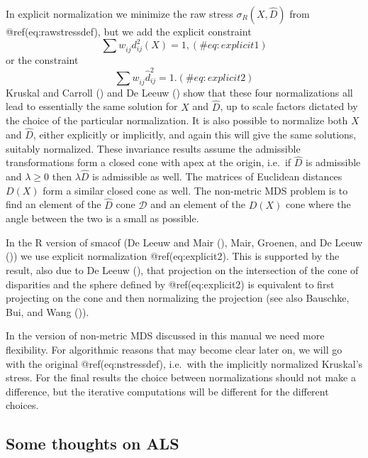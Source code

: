 \documentclass[
  12pt,
  letterpaper,
  DIV=11,
  numbers=noendperiod]{scrartcl}
\theoremstyle{plain}
\theoremstyle{remark}
\begin{document}
In explicit normalization we minimize the raw stress
\(\sigma_R(X,\hat D)\) from @ref(eq:rawstressdef), but we add the
explicit constraint \begin{equation}
\sum   w_{ij}^{\ }d_{ij}^2(X)=1,
(\#eq:explicit1)
\end{equation} or the constraint \begin{equation}
\sum   w_{ij}^{\ }\hat d_{ij}^2=1.
(\#eq:explicit2)
\end{equation} Kruskal and Carroll
() and De Leeuw
() show that these four normalizations
all lead to essentially the same solution for \(X\) and \(\hat D\), up
to scale factors dictated by the choice of the particular normalization.
It is also possible to normalize both \(X\) and \(\hat D\), either
explicitly or implicitly, and again this will give the same solutions,
suitably normalized. These invariance results assume the admissible
transformations form a closed cone with apex at the origin, i.e.~if
\(\hat D\) is admissible and \(\lambda\geq 0\) then \(\lambda\hat D\) is
admissible as well. The matrices of Euclidean distances \(D(X)\) form a
similar closed cone as well. The non-metric MDS problem is to find an
element of the \(\hat D\) cone \(\mathcal{D}\) and an element of the
\(D(X)\) cone where the angle between the two is a small as possible.

In the R version of smacof (De Leeuw and Mair
(), Mair, Groenen, and De Leeuw
()) we use explicit
normalization @ref(eq:explicit2). This is supported by the result, also
due to De Leeuw (), that projection on
the intersection of the cone of disparities and the sphere defined by
@ref(eq:explicit2) is equivalent to first projecting on the cone and
then normalizing the projection (see also Bauschke, Bui, and Wang
()).

In the version of non-metric MDS discussed in this manual we need more
flexibility. For algorithmic reasons that may become clear later on, we
will go with the original @ref(eq:nstressdef), i.e.~with the implicitly
normalized Kruskal's stress. For the final results the choice between
normalizations should not make a difference, but the iterative
computations will be different for the different choices.

\subsection{Some thoughts on ALS}\label{some-thoughts-on-als}
\end{document}
